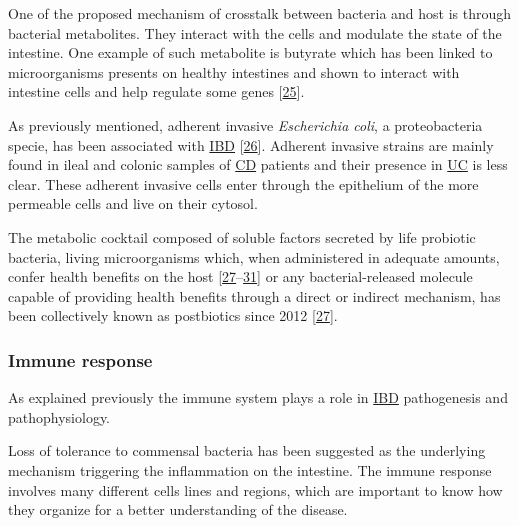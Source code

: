 \documentclass[
  12pt,
  a4paper,
  twoside,
  openright]{book}
\begin{document}
One of the proposed mechanism of crosstalk between bacteria and host is through bacterial metabolites.
They interact with the cells and modulate the state of the intestine.
One example of such metabolite is butyrate which has been linked to microorganisms presents on healthy intestines and shown to interact with intestine cells and help regulate some genes {[}\protect\hyperlink{ref-ferrer-picuxf3n2020}{25}{]}.

As previously mentioned, adherent invasive \emph{Escherichia coli}, a proteobacteria specie, has been associated with \protect\hyperlink{acronyms_IBD}{IBD} {[}\protect\hyperlink{ref-darfeuille-michaud1998}{26}{]}.
Adherent invasive strains are mainly found in ileal and colonic samples of \protect\hyperlink{acronyms_CD}{CD} patients and their presence in \protect\hyperlink{acronyms_UC}{UC} is less clear.
These adherent invasive cells enter through the epithelium of the more permeable cells and live on their cytosol.

The metabolic cocktail composed of soluble factors secreted by life probiotic bacteria, living microorganisms which, when administered in adequate amounts, confer health benefits on the host {[}\protect\hyperlink{ref-tsilingiri2012}{27}--\protect\hyperlink{ref-morelli2012}{31}{]} or any bacterial-released molecule capable of providing health benefits through a direct or indirect mechanism, has been collectively known as postbiotics since 2012 {[}\protect\hyperlink{ref-tsilingiri2012}{27}{]}.

\hypertarget{immune-response}{%
\subsubsection{Immune response}\label{immune-response}}

As explained previously the immune system plays a role in \protect\hyperlink{acronyms_IBD}{IBD} pathogenesis and pathophysiology.

Loss of tolerance to commensal bacteria has been suggested as the underlying mechanism triggering the inflammation on the intestine.
The immune response involves many different cells lines and regions, which are important to know how they organize for a better understanding of the disease.
\end{document}
